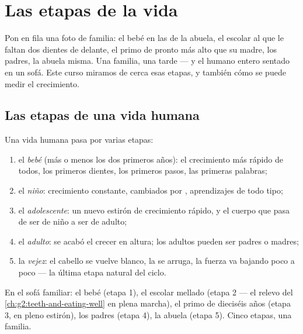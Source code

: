 \chapter{Las etapas de la vida}\label{ch:g3:stages-of-life}

Pon en fila una foto de familia: el bebé en las  de la abuela,
el escolar al que le faltan dos dientes de delante, el primo
 de pronto más alto que su madre, los padres, la abuela
misma. Una familia, una tarde --- y el  humano entero
sentado en un sofá. Este curso miramos de cerca esas etapas, y también
cómo se puede medir el crecimiento.

\section{Las etapas de una vida humana}

\begin{definition}\label{def:g3:stages-of-life:stages}
Una vida humana pasa por varias etapas:
\begin{enumerate}
  \item el \emph{bebé} (más o menos los dos primeros
        años): el crecimiento más rápido de todos, los primeros
        dientes, los primeros pasos, las primeras palabras;
  \item el \emph{niño}: crecimiento constante,  cambiados por , aprendizajes de todo
        tipo;
  \item el \emph{adolescente}: un nuevo estirón de
        crecimiento rápido, y el cuerpo que pasa de ser de niño a ser
        de adulto;
  \item el \emph{adulto}: se acabó el crecer en altura;
        los adultos pueden ser padres o madres;
  \item la \emph{vejez}: el cabello se vuelve blanco, la
         se arruga, la fuerza va bajando poco a poco --- la última
        etapa natural del ciclo.
\end{enumerate}
\end{definition}

\begin{example}\label{ex:g3:stages-of-life:sofa}
En el sofá familiar: el bebé (etapa 1), el escolar mellado (etapa 2
--- el relevo del \cref{ch:g2:teeth-and-eating-well} en plena marcha),
el primo de dieciséis años (etapa 3, en pleno estirón), los padres
(etapa 4), la abuela (etapa 5). Cinco etapas, una familia.
\end{example}

